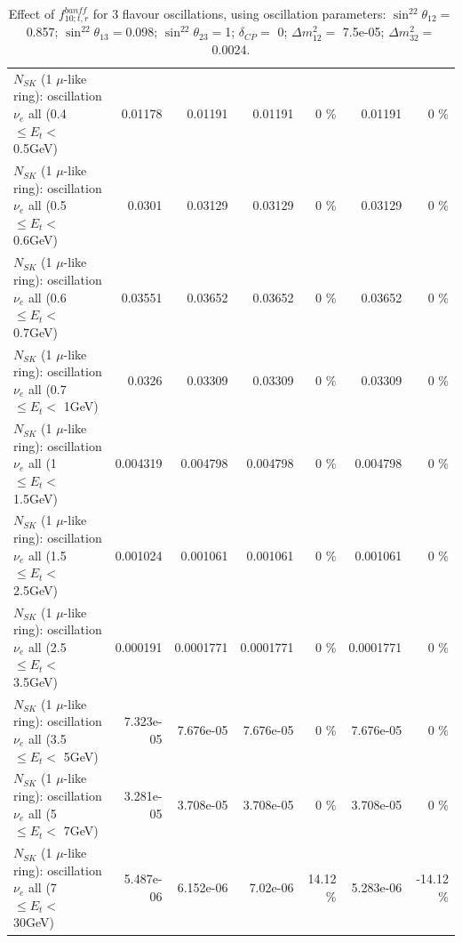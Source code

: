 \begin{table}
\begin{tabular}{| l | r | r | r  r | r  r |}
$N_{SK}$ (1 $\mu$-like ring): oscillation $\nu_{e}$ all (0.4 $\leq E_{t} <$ 0.5GeV) &         0.01178 &         0.01191 &         0.01191 &        0 \%  &         0.01191 &        0 \%  \\ 
$N_{SK}$ (1 $\mu$-like ring): oscillation $\nu_{e}$ all (0.5 $\leq E_{t} <$ 0.6GeV) &          0.0301 &         0.03129 &         0.03129 &        0 \%  &         0.03129 &        0 \%  \\ 
$N_{SK}$ (1 $\mu$-like ring): oscillation $\nu_{e}$ all (0.6 $\leq E_{t} <$ 0.7GeV) &         0.03551 &         0.03652 &         0.03652 &        0 \%  &         0.03652 &        0 \%  \\ 
$N_{SK}$ (1 $\mu$-like ring): oscillation $\nu_{e}$ all (0.7 $\leq E_{t} <$ 1GeV) &          0.0326 &         0.03309 &         0.03309 &        0 \%  &         0.03309 &        0 \%  \\ 
$N_{SK}$ (1 $\mu$-like ring): oscillation $\nu_{e}$ all (1 $\leq E_{t} <$ 1.5GeV) &        0.004319 &        0.004798 &        0.004798 &        0 \%  &        0.004798 &        0 \%  \\ 
$N_{SK}$ (1 $\mu$-like ring): oscillation $\nu_{e}$ all (1.5 $\leq E_{t} <$ 2.5GeV) &        0.001024 &        0.001061 &        0.001061 &        0 \%  &        0.001061 &        0 \%  \\ 
$N_{SK}$ (1 $\mu$-like ring): oscillation $\nu_{e}$ all (2.5 $\leq E_{t} <$ 3.5GeV) &        0.000191 &       0.0001771 &       0.0001771 &        0 \%  &       0.0001771 &        0 \%  \\ 
$N_{SK}$ (1 $\mu$-like ring): oscillation $\nu_{e}$ all (3.5 $\leq E_{t} <$ 5GeV) &       7.323e-05 &       7.676e-05 &       7.676e-05 &        0 \%  &       7.676e-05 &        0 \%  \\ 
 $N_{SK}$ (1 $\mu$-like ring): oscillation $\nu_{e}$ all (5 $\leq E_{t} <$ 7GeV) &       3.281e-05 &       3.708e-05 &       3.708e-05 &        0 \%  &       3.708e-05 &        0 \%  \\ 
$N_{SK}$ (1 $\mu$-like ring): oscillation $\nu_{e}$ all (7 $\leq E_{t} <$ 30GeV) &       5.487e-06 &       6.152e-06 &        7.02e-06 &    14.12 \%  &       5.283e-06 &   -14.12 \%  \\ 
\hline
\hline
\end{tabular}
\caption{ Effect of $f_{10; t, r}^{banff}$ for 3 flavour oscillations, using oscillation parameters:  $\sin^22\theta_{12} = $0.857; $\sin^22\theta_{13} = $0.098; $\sin^22\theta_{23} = $1; $\delta_{CP} = $        0; $\Delta m^2_{12} = $    7.5e-05; $\Delta m^2_{32} = $    0.0024. }
\label{tab:num_banff_10_1RmuT_3f_osc_t13:0.098}
\end{table}
